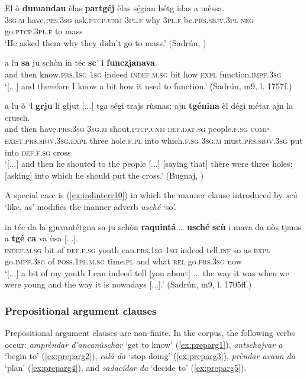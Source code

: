 \ea\label{ex:indinterr6}
\gll    El ò \textbf{dumandau} èlas \textbf{partgéj} èlas sé̱gian bétg idas a mèssa.\\
\textsc{3sg.m} have.\textsc{prs.3sg} ask.\textsc{ptcp.unm} \textsc{3pl.f} why  \textsc{3pl.f} be.\textsc{prs.sbjv.3pl} \textsc{neg} go.\textsc{ptcp.3pl.f} to mass\\
\glt `He asked them why they didn’t go to mass.' (Sadrún, \citealt[103]{Büchli1966})
\z

\ea
\label{ex:indinterr7}
\gll [...] a lu \textbf{sa} ju schòn in téc \textbf{sc}’ \textbf{i} \textbf{funczjanava}.   \\
{} and then know.\textsc{prs.1sg} \textsc{1sg} indeed \textsc{indef.m.sg} bit how \textsc{expl} function.\textsc{impf.3sg}\\
\glt `[...] and therefore I know a bit how it used to function.' (Sadrún, m9, l. 1757f.)
\z

\ea
\label{ex:indinterr8}
\gll [...] a lu ò `l \textbf{grju} li gljut [...] tga ségi trajs rùsnas; ajn \textbf{tgénina} èl dégi métar ajn la crusch.\\
{} and then have.\textsc{prs.3sg} \textsc{3sg.m} shout.\textsc{ptcp.unm} \textsc{def.dat.sg} people.\textsc{f.sg} {} \textsc{comp} \textsc{exist.prs.sbjv.3sg.expl} three hole.\textsc{f.pl} into which.\textsc{f.sg} \textsc{3sg.m} must.\textsc{prs.sbjv.3sg} put into \textsc{def.f.sg} cross\\
\glt `[...] and then he shouted to the people [...] [saying that] there were three holes; [asking] into which he should put the cross.' (Bugnaj, \citealt[134]{Büchli1966})
\z

A special case is (\ref{ex:indinterr10}) in which the manner clause introduced by \textit{scù} `like, as' modifies the manner adverb \textit{usché} `so'.

\ea
\label{ex:indinterr10}
\gll [...] in téc da la gjuvantétgna sa ju schòn \textbf{raquintá} … \textbf{usché} \textbf{scù} i mava da nòs tjams a \textbf{tgé} \textbf{ca} va ùsa [...].\\
{} \textsc{indef.m.sg} bit of \textsc{def.f.sg} youth can.\textsc{prs.1sg} \textsc{1sg} indeed tell.\textsc{inf} {} so as \textsc{expl} go.\textsc{impf.3sg} of \textsc{poss.1pl.m.sg} time.\textsc{pl} and what \textsc{rel} go.\textsc{prs.3sg} now \\
\glt `[...] a bit of my youth I can indeed tell [you about] ... the way it was when we were young and the way it is nowadays [...].' (Sadrún, m9, l. 1705ff.)
\z

\subsubsection{Prepositional argument clauses}
Prepositional argument clauses are non-finite. In the corpus, the following verbs occur: \textit{amprèndar d'ancanùschar} `get to know' (\ref{ex:preparg1}), \textit{antschajvar a} `begin to' (\ref{ex:preparg2}), \textit{calá da} `stop doing' (\ref{ex:preparg3}), \textit{prèndar avaun da} `plan' (\ref{ex:preparg4}), and \textit{sadacídar da} `decide to' (\ref{ex:preparg5}).
 
